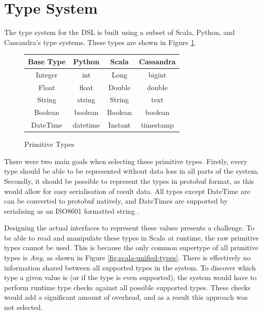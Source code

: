 

\section{Type System}
The type system for the DSL is built using a subset of Scala, Python, and Cassandra's type systems. These types are shown in Figure \ref{fig:datatypes}.

\begin{figure}[h]
	\centering
	\begin{tabular}{| c | c | c | c |}
		\hline
		\textbf{Base Type} & \textbf{Python} & \textbf{Scala} & \textbf{Cassandra} \\ \hline
		Integer & int & Long & bigint \\ \hline
		Float & float & Double & double \\ \hline
		String & string & String & text \\ \hline
		Boolean & boolean & Boolean & boolean \\ \hline
		DateTime & datetime & Instant & timestamp \\ \hline
	\end{tabular}
	\caption{Primitive Types}
	\label{fig:datatypes}
\end{figure}

There were two main goals when selecting these primitive types. Firstly, every type should be able to be represented without data loss in all parts of the system. Secondly, it should be possible to represent the types in protobuf format, as this would allow for easy serialisation of result data. All types except DateTime are can be converted to protobuf natively, and DateTimes are supported by serialising as an ISO8601 formatted string \cite{iso_8601}.

Designing the actual interfaces to represent these values presents a challenge. To be able to read and manipulate these types in Scala at runtime, the raw primitive types cannot be used. This is because the only common supertype of all primitive types is \textit{Any}, as shown in Figure \ref{fig:scala-unified-types}. There is effectively no information shared between all supported types in the system. To discover which type a given value is (or if the type is even supported), the system would have to perform runtime type checks against all possible supported types. These checks would add a significant amount of overhead, and as a result this approach was not selected.

